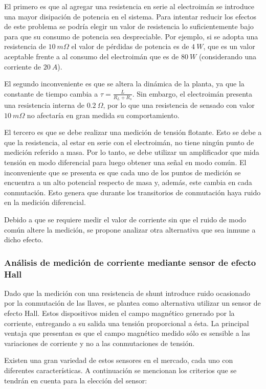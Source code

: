 El primero es que al agregar una resistencia en serie al electroimán se introduce una mayor disipación de potencia en el sistema. Para intentar reducir los efectos de este problema se podría elegir un valor de resistencia lo suficientemente bajo para que su consumo de potencia sea despreciable. Por ejemplo, si se adopta una resistencia de $10\:m\Omega$ el valor de pérdidas de potencia es de $4\:W$, que es un valor aceptable frente a al consumo del electroimán que es de $80\:W$ (considerando una corriente de $20\:A$).

El segundo inconveniente es que se altera la dinámica de la planta, ya que la constante de tiempo cambia a $\tau=\frac{L}{R_L+R_s}$. Sin embargo, el electroimán presenta una resistencia interna de $0.2\:\Omega$, por lo que una resistencia de sensado con valor $10\:m\Omega$ no afectaría en gran medida su comportamiento.

El tercero es que se debe realizar una medición de tensión flotante. Esto se debe a que la resistencia, al estar en serie con el electroimán, no tiene ningún punto de medición referido a masa. Por lo tanto, se debe utilizar un amplificador que mida tensión en modo diferencial para luego obtener una señal en modo común. El inconveniente que se presenta es que cada uno de los puntos de medición se encuentra a un alto potencial respecto de masa y, además, este cambia en cada conmutación. Esto genera que durante los transitorios de conmutación haya ruido en la medición diferencial.

Debido a que se requiere medir el valor de corriente sin que el ruido de modo común altere la medición, se propone analizar otra alternativa que sea inmune a dicho efecto.


\subsubsection{Análisis de medición de corriente mediante sensor de efecto Hall}

Dado que la medición con una resistencia de shunt introduce ruido ocasionado por la conmutación de las llaves, se plantea como alternativa utilizar un sensor de efecto Hall. Estos dispositivos miden el campo magnético generado por la corriente, entregando a su salida una tensión proporcional a ésta. La principal ventaja que presentan es que el campo magnético medido sólo es sensible a las variaciones de corriente y no a las conmutaciones de tensión.

Existen una gran variedad de estos sensores en el mercado, cada uno con diferentes características. A continuación se mencionan los criterios que se tendrán en cuenta para la elección del sensor:

